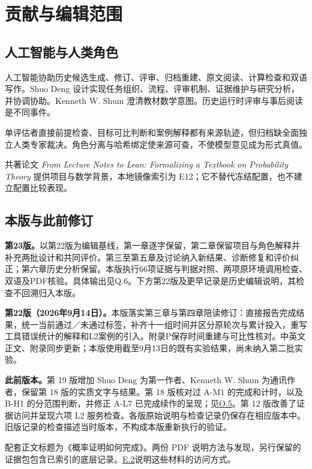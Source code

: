 \section[贡献与编辑范围]{\texorpdfstring{\protect\hypertarget{appendix-f}{}贡献与编辑范围}{贡献与编辑范围}}
\subsection[人工智能与人类角色]{\texorpdfstring{\protect\hypertarget{f1}{}人工智能与人类角色}{人工智能与人类角色}}
人工智能协助历史候选生成、修订、评审、归档重建、原文阅读、计算检查和双语写作。Shuo Deng 设计实现任务组织、流程、评审机制、证据维护与研究分析，并协调协助。Kenneth W. Shum 澄清教材数学意图。历史运行时评审与事后阅读是不同事件。

单评估者直接前提检查、目标可比判断和案例解释都有来源轨迹，但归档缺全面独立人类专家裁决。角色分离与哈希绑定使来源可查，不使模型意见成为形式真值。

共著论文 \emph{From Lecture Notes to Lean: Formalizing a Textbook on Probability Theory} 提供项目与数学背景，本地镜像索引为 E12；它不替代冻结配置，也不建立配置比较表现。

\subsection[本版与此前修订]{\texorpdfstring{\protect\hypertarget{f2}{}本版与此前修订}{本版与此前修订}}
\textbf{第23版。}以第22版为编辑基线，第一章逐字保留，第二章保留项目与角色解释并补充两批设计和共同评价。第三至第五章及讨论纳入新结果、诊断修复和评价纠正；第六章历史分析保留。本版执行66项证据与判据对照、两项原环境调用检查、双语及PDF核验。具体输出见Q.6。下方第22版及更早记录是历史编辑说明，其检查不回溯归入本版。

\textbf{第22版（2026年9月14日）。}本版落实第三章与第四章陪读修订：直接报告完成结果，统一当前通过／未通过标签，补齐十一组时间并区分原轮次与累计投入，重写工具错误统计的解释和L2案例的引入。附录P保存时间重建与可比性核对。中英文正文、附录同步更新；本版使用截至9月13日的既有实验结果，尚未纳入第二批实验。

\textbf{此前版本。}第 19 版增加 Shuo Deng 为第一作者、Kenneth W. Shum 为通讯作者，保留第 18 版的实质文字与结果。第 18 版核对过 A-M1 的完成和计时，以及 B-H1 的分范围判断，并修正 A-L7 已完成续作的呈现；见\hyperlink{o5}{O.5}。第 12 版改善了证据访问并呈现六项 L2 服务检查。各版原始说明与检查记录仍保存在相应版本中。旧版记录的检查描述当时版本，不构成本版重新执行的验证。

配套正文标题为《概率证明如何完成》。两份 PDF 说明方法与发现，另行保留的证据包包含已索引的底层记录。\hyperlink{e2}{E.2}说明这些材料的访问方式。

